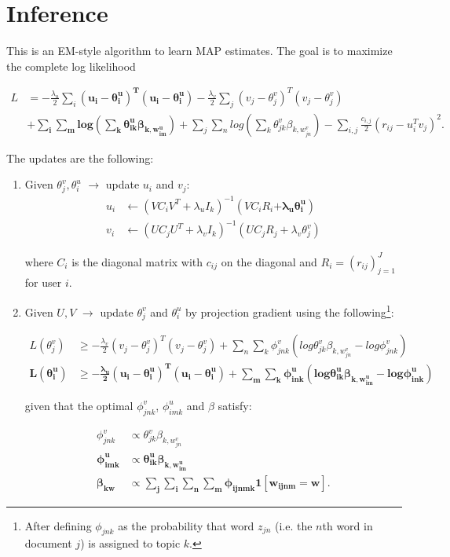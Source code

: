 \documentclass[12pt]{article}
\begin{document}
\section{Inference}
This is an EM-style algorithm to learn MAP estimates. The goal is to maximize the complete log likelihood

\begin{align*}
L &= - \frac{\lambda_u}{2} \sum_i \bm{(u_i - \theta^u_i)^T(u_i - \theta^u_i)} -\frac{\lambda_v}{2} \sum_j (v_j - \theta^v_j)^T(v_j - \theta^v_j) \\ 
& \bm{+ \sum_i \sum_m log( \sum_k \theta^u_{ik} \beta_{k,w^u_{im}})}  + \sum_j \sum_n log( \sum_k \theta^v_{jk} \beta_{k,w^v_{jn}}) - \sum_{i,j} \frac{c_{i,j}}{2} (r_{ij} - u^T_{i} v_{j})^2.
\end{align*}



The updates are the following:

\begin{enumerate}

\item Given $\theta^v_j,\theta^u_i$  $\rightarrow$ update $u_i$ and $v_j$:
\begin{align*}
u_i &\leftarrow (VC_i V^T + \lambda_u I_k)^{-1} (V C_i R_i \bm{+ \lambda_u \theta^u_i}) \\
v_i &\leftarrow (UC_j U^T + \lambda_v I_k)^{-1} (U C_j R_j + \lambda_v \theta^v_j)
\end{align*}

where $C_i$ is the diagonal matrix with $c_{ij}$ on the diagonal and $R_i = (r_{ij})_{j=1}^J$ for user $i$.


\item Given $U, V$  $\rightarrow$ update $\theta^v_j$ and $\theta^u_i$ by projection gradient using the following\footnote{After defining $\phi_{jnk}$ as the probability that word $z_{jn}$ (i.e. the $n$th word in document $j$) is assigned to topic $k$.}:

\begin{align*}
L(\theta^v_j) &\geq - \frac{\lambda_v}{2} (v_j - \theta^v_j)^T(v_j - \theta^v_j) + \sum_n \sum_k \phi^v_{jnk}(log\theta^v_{jk}\beta_{k,w^v_{jn}} - log \phi^v_{jnk})  \\
\bm{L(\theta^u_i)} &\bm{\geq - \frac{\lambda_u}{2} (u_i - \theta^u_i)^T(u_i - \theta^u_i) + \sum_m \sum_k \phi^u_{ink}(log\theta^u_{ik}\beta_{k,w^u_{im}} - log \phi^u_{ink})}
\end{align*}

given that the optimal $\phi^v_{jnk}$, $\phi^u_{imk}$ and $\beta$ satisfy:

\begin{align*}
\phi^v_{jnk} &\propto \theta^v_{jk} \beta_{k,w^v_{jn}} \\
\bm{\phi^u_{imk}} &\propto \bm{\theta^u_{ik} \beta_{k,w^u_{im}}} \\
\bm{\beta_{kw}} &\bm{\propto \sum_j \sum_i \sum_n \sum_m \phi_{ijnmk} 1[w_{ijnm} = w].}
\end{align*}



\end{enumerate}
\end{document}

